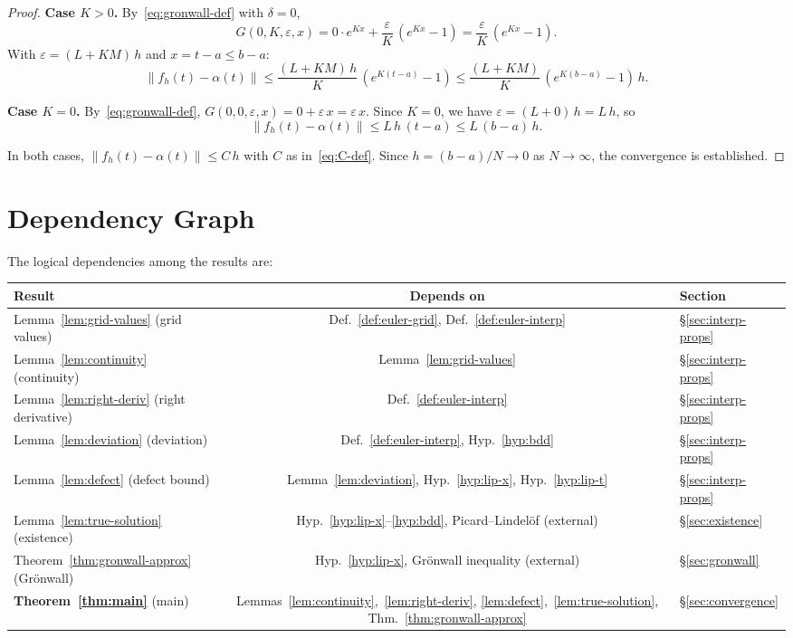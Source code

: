 \documentclass[11pt,a4paper]{article}
\theoremstyle{definition}
\newcommand{\norm}[1]{\lVert #1 \rVert}
\begin{document}
\begin{proof}
\textbf{Case $K > 0$.}
By~\eqref{eq:gronwall-def} with $\delta = 0$,
\[
  G(0, K, \varepsilon, x)
  = 0 \cdot e^{Kx} + \frac{\varepsilon}{K}\,(e^{Kx} - 1)
  = \frac{\varepsilon}{K}\,(e^{Kx} - 1).
\]
With $\varepsilon = (L + KM)\,h$ and $x = t - a \le b - a$:
\[
  \norm{f_h(t) - \alpha(t)}
  \le \frac{(L + KM)\,h}{K}\,(e^{K(t-a)} - 1)
  \le \frac{(L + KM)}{K}\,(e^{K(b-a)} - 1)\,h.
\]

\textbf{Case $K = 0$.}
By~\eqref{eq:gronwall-def},
$G(0, 0, \varepsilon, x) = 0 + \varepsilon\,x = \varepsilon\,x$.
Since $K = 0$, we have $\varepsilon = (L + 0)\,h = L\,h$, so
\[
  \norm{f_h(t) - \alpha(t)}
  \le L\,h\,(t - a)
  \le L\,(b - a)\,h.
\]

In both cases, $\norm{f_h(t) - \alpha(t)} \le C\,h$ with $C$
as in~\eqref{eq:C-def}. Since $h = (b-a)/N \to 0$ as $N \to \infty$,
the convergence is established.
\end{proof}


\section{Dependency Graph}\label{sec:dependency}

The logical dependencies among the results are:

\medskip
\begin{center}
\begin{tabular}{@{}lcl@{}}
\toprule
\textbf{Result} & \textbf{Depends on} & \textbf{Section} \\
\midrule
Lemma~\ref{lem:grid-values} (grid values)
  & Def.~\ref{def:euler-grid}, Def.~\ref{def:euler-interp}
  & \S\ref{sec:interp-props} \\
Lemma~\ref{lem:continuity} (continuity)
  & Lemma~\ref{lem:grid-values}
  & \S\ref{sec:interp-props} \\
Lemma~\ref{lem:right-deriv} (right derivative)
  & Def.~\ref{def:euler-interp}
  & \S\ref{sec:interp-props} \\
Lemma~\ref{lem:deviation} (deviation)
  & Def.~\ref{def:euler-interp}, Hyp.~\ref{hyp:bdd}
  & \S\ref{sec:interp-props} \\
Lemma~\ref{lem:defect} (defect bound)
  & Lemma~\ref{lem:deviation}, Hyp.~\ref{hyp:lip-x},
    Hyp.~\ref{hyp:lip-t}
  & \S\ref{sec:interp-props} \\
Lemma~\ref{lem:true-solution} (existence)
  & Hyp.~\ref{hyp:lip-x}--\ref{hyp:bdd},
    Picard--Lindel\"of (external)
  & \S\ref{sec:existence} \\
Theorem~\ref{thm:gronwall-approx} (Gr\"onwall)
  & Hyp.~\ref{hyp:lip-x}, Gr\"onwall inequality (external)
  & \S\ref{sec:gronwall} \\
\textbf{Theorem~\ref{thm:main}} (main)
  & Lemmas~\ref{lem:continuity},~\ref{lem:right-deriv},
    \ref{lem:defect},~\ref{lem:true-solution},
    Thm.~\ref{thm:gronwall-approx}
  & \S\ref{sec:convergence} \\
\bottomrule
\end{tabular}
\end{center}
\end{document}

